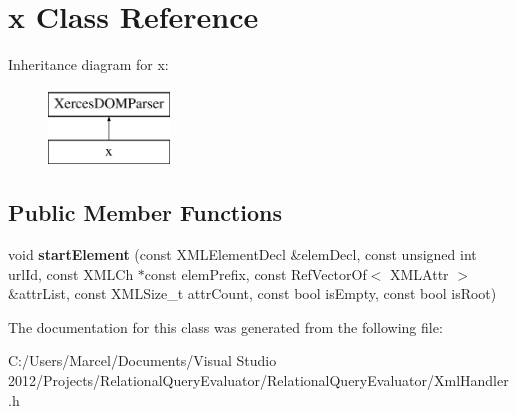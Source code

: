 \hypertarget{classx}{\section{x Class Reference}
\label{classx}
}
Inheritance diagram for x\+:\begin{figure}[H]
\begin{center}
\leavevmode
\includegraphics[height=2.000000cm]{classx}
\end{center}
\end{figure}
\subsection*{Public Member Functions}
\begin{DoxyCompactItemize}
\item 
\hypertarget{classx_a030bcc830aa3d92426fe5e2816b36ebf}{void {\bfseries start\+Element} (const X\+M\+L\+Element\+Decl \&elem\+Decl, const unsigned int url\+Id, const X\+M\+L\+Ch $\ast$const elem\+Prefix, const Ref\+Vector\+Of$<$ X\+M\+L\+Attr $>$ \&attr\+List, const X\+M\+L\+Size\+\_\+t attr\+Count, const bool is\+Empty, const bool is\+Root)}\label{classx_a030bcc830aa3d92426fe5e2816b36ebf}

\end{DoxyCompactItemize}


The documentation for this class was generated from the following file\+:\begin{DoxyCompactItemize}
\item 
C\+:/\+Users/\+Marcel/\+Documents/\+Visual Studio 2012/\+Projects/\+Relational\+Query\+Evaluator/\+Relational\+Query\+Evaluator/Xml\+Handler.\+h\end{DoxyCompactItemize}
